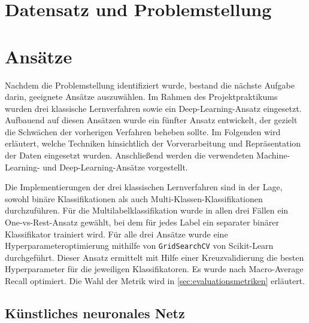 \documentclass[researchlab,palatino]{AIGpaper}
\begin{document}
\section{Datensatz und Problemstellung}
\label{Datensatz}


\section{Ansätze}
\label{sec:Ansaetze}
Nachdem die Problemstellung identifiziert wurde, bestand die nächste Aufgabe darin, geeignete Ansätze auszuwählen. Im Rahmen des Projektpraktikums wurden drei klassische Lernverfahren sowie ein Deep-Learning-Ansatz eingesetzt. Aufbauend auf diesen Ansätzen wurde ein fünfter Ansatz entwickelt, der gezielt die Schwächen der vorherigen Verfahren beheben sollte. Im Folgenden wird erläutert, welche Techniken hinsichtlich der Vorverarbeitung und Repräsentation der Daten eingesetzt wurden. Anschließend werden die verwendeten Machine-Learning- und Deep-Learning-Ansätze vorgestellt.

Die Implementierungen der drei klassischen Lernverfahren sind in der Lage, sowohl binäre Klassifikationen als auch Multi-Klassen-Klassifikationen durchzuführen. Für die Multilabelklassifikation wurde in allen drei Fällen ein One-vs-Rest-Ansatz gewählt, bei dem für jedes Label ein separater binärer Klassifikator trainiert wird. Für alle drei Ansätze wurde eine Hyperparameteroptimierung mithilfe von \texttt{GridSearchCV} von Scikit-Learn \cite{Pedregosa2011} durchgeführt. Dieser Ansatz ermittelt mit Hilfe einer Kreuzvalidierung die besten Hyperparameter für die jeweiligen Klassifikatoren. Es wurde nach Macro-Average Recall optimiert. Die Wahl der Metrik wird in \ref{sec:evaluationsmetriken} erläutert.









\subsection{Künstliches neuronales Netz}
\label{KNN}

\end{document}
